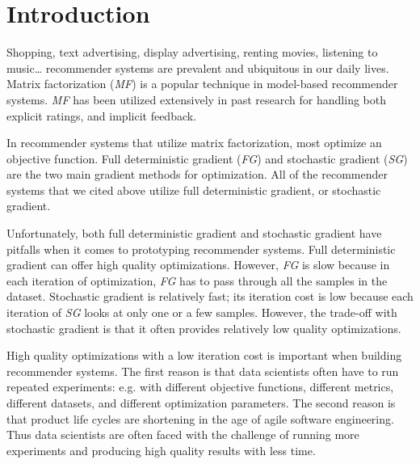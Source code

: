 \section{Introduction}
Shopping, text advertising, display advertising, renting movies, listening to music… recommender systems are prevalent and ubiquitous in our daily lives.  
Matrix factorization (\emph{MF}) is a popular technique in model-based recommender systems.  
\emph{MF} has been utilized extensively in past research for handling both explicit \cite{mmmf2005fast, mnar, gapfm} ratings, 
and implicit \cite{wrmf2008hu, wrmf2008pan, climf, bpr, mnar} feedback.  

In recommender systems that utilize matrix factorization, most optimize an objective function.  
Full deterministic gradient (\emph{FG}) and stochastic gradient (\emph{SG}) are the two main gradient methods for optimization.  
All of the recommender systems that we cited above utilize full deterministic gradient, or stochastic gradient.

Unfortunately, both full deterministic gradient and stochastic gradient have pitfalls when it comes to prototyping recommender systems.  
Full deterministic gradient can offer high quality optimizations.  
However, \emph{FG} is slow because in each iteration of optimization, \emph{FG} has to pass through all the samples in the dataset.  
Stochastic gradient is relatively fast; its iteration cost is low because each iteration of \emph{SG} looks at only one or a few samples.  
However, the trade-off with stochastic gradient is that it often provides relatively low quality optimizations.  

High quality optimizations with a low iteration cost is important when building recommender systems.  
The first reason is that data scientists often have to run repeated experiments: e.g. with different objective functions, different metrics, different datasets, and different optimization parameters.  
The second reason is that product life cycles are shortening in the age of agile software engineering.  
Thus data scientists are often faced with the challenge of running more experiments and producing high quality results with less time.  

